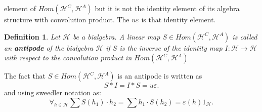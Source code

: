 \documentclass[a4paper, 12pt]{report}
\newtheorem{definition}{Definition}
\begin{document}
element of $Hom(\mathcal{H}^C, \mathcal{H}^A)$ but it is not the identity element of its algebra structure
with convolution product. The $u\varepsilon$ is that identity element.
\begin{definition}
Let $\mathcal{H}$ be a bialgebra. A linear map $S \in Hom(\mathcal{H}^C, \mathcal{H}^A)$ is called an
\textbf{antipode} of the bialgebra $\mathcal{H}$ if $S$ is the inverse of the identity map
$I : \mathcal{H} \to \mathcal{H}$ with respect to the convolution product in
$Hom(\mathcal{H}^C, \mathcal{H}^A)$
\end{definition}
The fact that $S \in Hom(\mathcal{H}^C, \mathcal{H}^A)$ is an antipode is written as
\begin{equation*}
S * I = I * S = u\varepsilon.
\end{equation*}
and using sweedler notation as:
\begin{equation*}
\forall_{h \in \mathcal{H}} \sum S(h_1) \cdot h_2 = \sum h_1 \cdot S(h_2) = \varepsilon(h)1_\mathcal{H}.
\end{equation*}
\end{document}

